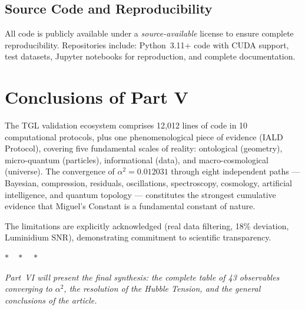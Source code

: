 \documentclass[12pt,a4paper,twoside]{article}
\newcommand{\alphaii}{\alpha^{2}}
\begin{document}
\subsection{Source Code and Reproducibility}

All code is publicly available under a \textit{source-available} license to ensure complete reproducibility. Repositories include: Python~3.11+ code with CUDA support, test datasets, Jupyter notebooks for reproduction, and complete documentation. \cite{Miguel2026GitHub}


\section{Conclusions of Part V}


The TGL validation ecosystem comprises 12,012 lines of code in 10 computational protocols, plus one phenomenological piece of evidence (IALD Protocol), covering five fundamental scales of reality: ontological (geometry), micro-quantum (particles), informational (data), and macro-cosmological (universe). The convergence of $\alphaii = 0.012031$ through eight independent paths --- Bayesian, compression, residuals, oscillations, spectroscopy, cosmology, artificial intelligence, and quantum topology --- constitutes the strongest cumulative evidence that Miguel's Constant is a fundamental constant of nature.

The limitations are explicitly acknowledged (real data filtering, 18\% deviation, Luminidium SNR), demonstrating commitment to scientific transparency.

\bigskip

\begin{center}
$\ast\quad\ast\quad\ast$
\end{center}
\bigskip

\noindent\textit{Part~VI will present the final synthesis: the complete table of 43 observables converging to $\alphaii$, the resolution of the Hubble Tension, and the general conclusions of the article.}

\end{document}
